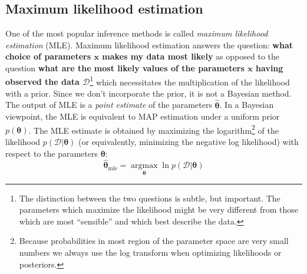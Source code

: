 \documentclass[12pt,dvipsnames]{report}
\renewcommand{\vec}[1]{\boldsymbol{\mathbf{#1}}}
\begin{document}

\subsection{Maximum likelihood estimation}
One of the most popular inference methods is called \emph{maximum likelihood
    estimation} (MLE). Maximum likelihood estimation answers the question:
\textbf{what choice of parameters $\vec{x}$ makes my data most likely} as
opposed to the question \textbf{what are the most likely values of the
    parameters $\vec{x}$ having observed the data $\mathcal{D}$}\footnote{The
    distinction between the two questions is subtle, but important. The parameters
    which maximize the likelihood might be very different from those which are most
    ``sensible'' and which best describe the data.} which necessitates the
multiplication of the likelihood with a prior. Since we don't incorporate the
prior, it is not a Bayesian method. The output of MLE is a \emph{point
    estimate} of the parameters $\hat{\vec{\theta}}$. In a Bayesian viewpoint, the
MLE is equivalent to MAP estimation under a uniform prior $p(\vec{\theta})$.
The MLE estimate is obtained by maximizing the logarithm\footnote{Because
    probabilities in most region of the parameter space are very small numbers we
    always use the log transform when optimizing likelihoods or posteriors.} of the
likelihood $p(\mathcal{D}\lvert\vec{\theta})$ (or equivalently, minimizing the
negative log likelihood) with respect to the parameters $\vec{\theta}$:
\begin{equation}
    \hat{\boldsymbol{\theta}}_{\mathrm{mle}}=\underset{\boldsymbol{\theta}}{\operatorname{argmax}}
    \ln p\left(\mathcal{D}\lvert \boldsymbol{\theta}\right)
\end{equation}
\end{document}
